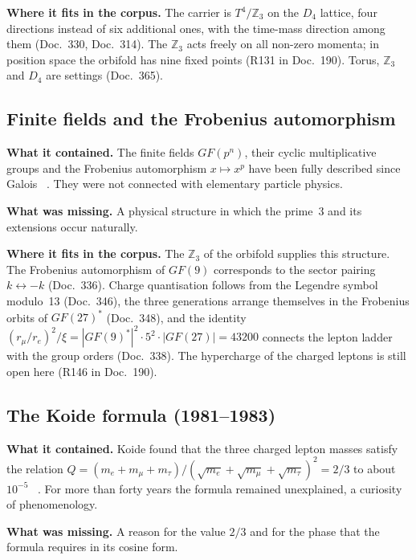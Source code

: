 \textbf{Where it fits in the corpus.} The carrier is $T^4/\mathbb{Z}_3$ on the $D_4$ lattice, four
directions instead of six additional ones, with the time-mass direction among them (Doc.~330,
Doc.~314). The $\mathbb{Z}_3$ acts freely on all non-zero momenta; in position space the orbifold has
nine fixed points (R131 in Doc.~190). Torus, $\mathbb{Z}_3$ and $D_4$ are settings \SetzM{}
(Doc.~365).

\subsection{Finite fields and the Frobenius automorphism}
\label{sec:galois390}

\textbf{What it contained.} The finite fields $GF(p^n)$, their cyclic multiplicative groups and the
Frobenius automorphism $x\mapsto x^p$ have been fully described since Galois \EM~\cite{Lidl1997}.
They were not connected with elementary particle physics.

\textbf{What was missing.} A physical structure in which the prime~3 and its extensions occur
naturally.

\textbf{Where it fits in the corpus.} The $\mathbb{Z}_3$ of the orbifold supplies this structure. The
Frobenius automorphism of $GF(9)$ corresponds to the sector pairing $k\leftrightarrow-k$ \BM{}
(Doc.~336). Charge quantisation follows from the Legendre symbol modulo~13 \BM{} (Doc.~346), the
three generations arrange themselves in the Frobenius orbits of $GF(27)^*$ \BM{} (Doc.~348), and the
identity $(r_\mu/r_e)^2/\xi=|GF(9)^*|^2\cdot5^2\cdot|GF(27)|=43200$ connects the lepton ladder with
the group orders \KM{} (Doc.~338). The hypercharge of the charged leptons is still open here (R146
in Doc.~190).

\subsection{The Koide formula (1981--1983)}

\textbf{What it contained.} Koide found that the three charged lepton masses satisfy the relation
$Q=(m_e+m_\mu+m_\tau)/(\sqrt{m_e}+\sqrt{m_\mu}+\sqrt{m_\tau})^2=2/3$ to about $10^{-5}$
\QM~\cite{Koide1983}. For more than forty years the formula remained unexplained, a curiosity of
phenomenology.

\textbf{What was missing.} A reason for the value $2/3$ and for the phase that the formula requires
in its cosine form.

